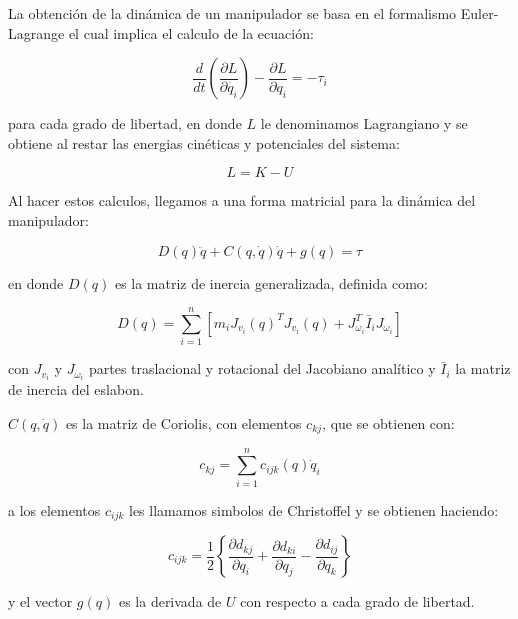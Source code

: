 \begin{multicols*}{3}
        La obtención de la dinámica de un manipulador se basa en el formalismo Euler-Lagrange el cual implica el calculo de la ecuación:

        \begin{equation}
            \frac{d}{dt} \left( \frac{\partial L}{\partial \dot{q_i}} \right) - \frac{\partial L}{\partial q_i} = - \tau_i
        \end{equation}

        para cada grado de libertad, en donde $L$ le denominamos Lagrangiano y se obtiene al restar las energias cinéticas y potenciales del sistema:

        \begin{equation}
            L = K - U
        \end{equation}

        Al hacer estos calculos, llegamos a una forma matricial para la dinámica del manipulador:

        \begin{equation}
            D(q) \ddot{q} + C(q, \dot{q}) \dot{q} + g(q) = \tau
        \end{equation}

        en donde $D(q)$ es la matriz de inercia generalizada, definida como:

        \begin{equation}
            D(q) = \sum_{i=1}^n \left[ m_i J_{v_i}(q)^T J_{v_i}(q) + J_{\omega_i}^T \bar{I}_i J_{\omega_i} \right]
        \end{equation}

        con $J_{v_i}$ y $J_{\omega_i}$ partes traslacional y rotacional del Jacobiano analítico y $\bar{I}_i$ la matriz de inercia del eslabon.

        $C(q, \dot{q})$ es la matriz de Coriolis, con elementos $c_{kj}$, que se obtienen con:

        \begin{equation}
            c_{kj} = \sum_{i=1}^n c_{ijk}(q) \dot{q}_i
        \end{equation}

        a los elementos $c_{ijk}$ les llamamos simbolos de Christoffel y se obtienen haciendo:

        \begin{equation}
            c_{ijk} = \frac{1}{2} \left\{ \frac{\partial d_{kj}}{\partial q_i} + \frac{\partial d_{ki}}{\partial q_j} - \frac{\partial d_{ij}}{\partial q_k} \right\}
        \end{equation}

        y el vector $g(q)$ es la derivada de $U$ con respecto a cada grado de libertad.

\end{multicols*}

